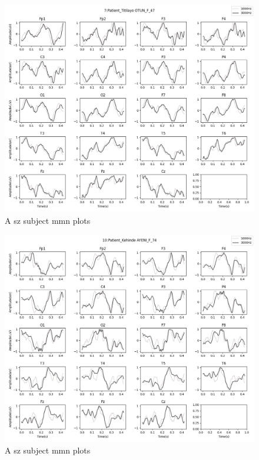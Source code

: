 \documentclass[10pt]{article}
\begin{document}
\begin{figure}[H]
  \includegraphics[width=16cm]{../../../data_analysis_results/MMN/time_series/Patient/7.png}
  \caption{A \gls{sz} subject \gls{mmn} plots}
\end{figure}
\begin{figure}[H]
  \includegraphics[width=16cm]{../../../data_analysis_results/MMN/time_series/Patient/10.png}
  \caption{A \gls{sz} subject \gls{mmn} plots}
\end{figure}
\end{document}
